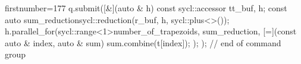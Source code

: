\begin{cppcode*}{firstnumber=177}
        q.submit([&](auto & h) {
            const sycl::accessor t{t_buf, h};
            const auto sum_reduction{sycl::reduction(r_buf, h, sycl::plus<>())};
            h.parallel_for(sycl::range<1>{number_of_trapezoids}, sum_reduction, [=](const auto & index, auto & sum) {
                sum.combine(t[index]);
            });
        }); // end of command group
\end{cppcode*}
